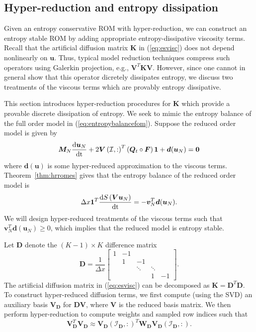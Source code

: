 \documentclass[review]{siamart171218}
\theoremstyle{assumption}
\newcommand{\td}[2]{\frac{{\rm d}#1}{{\rm d}{\rm #2}}}
\newcommand{\LRp}[1]{\left( #1 \right)}
\begin{document}
\subsection{Hyper-reduction and entropy dissipation}
\label{sec:diss}
Given an entropy conservative ROM with hyper-reduction, we can construct an entropy stable ROM by adding appropriate entropy-dissipative viscosity terms.  Recall that the artificial diffusion matrix $\bm{K}$ in (\ref{eq:esvisc}) does not depend nonlinearly on $\bm{u}$.  Thus, typical model reduction techniques compress such operators using Galerkin projection, e.g., $\bm{V}^T\bm{K}\bm{V}$.  However, since one cannot in general show that this operator dicretely dissipates entropy, we discuss two treatments of the viscous terms which are provably entropy dissipative.  

This section introduces hyper-reduction procedures for $\bm{K}$ which provide a provable discrete dissipation of entropy.  We seek to mimic the entropy balance of the full order model in (\ref{eq:entropybalancefom}).  Suppose the reduced order model is given by 
\[
\bm{M}_N\td{\bm{u}_N}{t} + 2\bm{V}\LRp{\mathcal{I},:}^T\LRp{\bm{Q}_t \circ \bm{F}}\bm{1} + \bm{d}(\bm{u}_N)= \bm{0}
\]
where $\bm{d}(\bm{u})$ is some hyper-reduced approximation to the viscous terms.  Theorem~\ref{thm:hrromes} gives that the entropy balance of the reduced order model is
\[
\Delta x \bm{1}^T\td{S\LRp{\bm{V}\bm{u}_N}}{t} = -\bm{v}_N^T\bm{d}(\bm{u}_N).
\]
We will design hyper-reduced treatments of the viscous terms such that $\bm{v}_N^T\bm{d}(\bm{u}_N) \geq 0$, which implies that the reduced model is entropy stable.  

Let $\bm{D}$ denote the $(K-1)\times K$ difference matrix
\[
\bm{D} = \frac{1}{\Delta x}\begin{bmatrix}
1 & -1 &&& \\
 & 1 & -1 && \\
 & & \ddots & \ddots&\\
&  & & 1 & -1
\end{bmatrix}.
\]
The artificial diffusion matrix in (\ref{eq:esvisc}) can be decomposed as $\bm{K} = \bm{D}^T\bm{D}$.  To construct hyper-reduced diffusion terms, we first compute (using the SVD) an auxiliary basis $\bm{V}_{\bm{D}}$ for $\bm{D}\bm{V}$, where $\bm{V}$ is the reduced basis matrix.  We then perform hyper-reduction to compute weights and sampled row indices such that 
\[
\bm{V}_{\bm{D}}^T\bm{V}_{\bm{D}} \approx \bm{V}_{\bm{D}}\LRp{\mathcal{I}_{\bm{D}},:}^T \bm{W}_{\bm{D}}\bm{V}_{\bm{D}}\LRp{\mathcal{I}_{\bm{D}},:}.
\]
\end{document}
